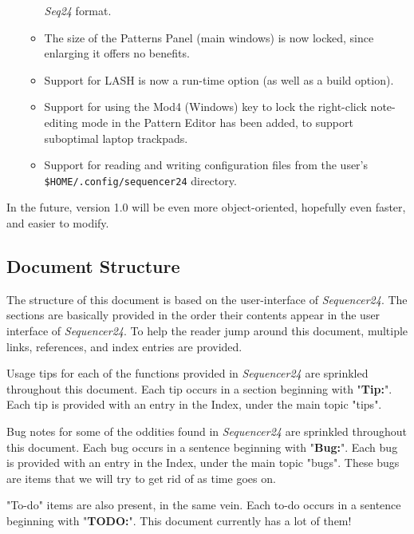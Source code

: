 \documentclass[
 11pt,
 twoside,
 a4paper,
 headinclude,
 footinclude,
 final                                 %
]{article}
\begin{document}
\begin{itemize}
\begin{itemize}
            \textsl{Seq24} format.
         \item The size of the Patterns Panel (main windows) is now locked,
            since enlarging it offers no benefits.
         \item Support for LASH is now a run-time option (as well as a build
            option).
         \item Support for using the Mod4 (Windows) key to lock the
            right-click note-editing mode in the Pattern Editor has been
            added, to support suboptimal laptop trackpads.
         \item Support for reading and writing configuration files from the
            user's \texttt{\$HOME/.config/sequencer24} directory.
      \end{itemize}
   \end{itemize}

   In the future, version 1.0 will be even more object-oriented, hopefully
   even faster, and easier to modify.

\subsection{Document Structure}
\label{subsec:introduction_document_structure}

   The structure of this document is based on the user-interface of
   \textsl{Sequencer24}.  The sections are basically provided in the order
   their contents appear in the user interface of \textsl{Sequencer24}.  To
   help the reader jump around this document, multiple links, references,
   and index entries are provided.

   Usage tips
   for each of the functions provided in
   \textsl{Sequencer24} are sprinkled throughout this document.
   Each tip occurs in a section beginning with "\textbf{Tip:}".
   Each tip is provided with an entry in the Index, under the
   main topic "tips".

   Bug notes
   for some of the oddities found in \textsl{Sequencer24} are
   sprinkled throughout this document.
   Each bug occurs in a sentence beginning with "\textbf{Bug:}".
   Each bug is provided with an entry in the Index, under the
   main topic "bugs".  These bugs are items that we will try to
   get rid of as time goes on.

   "To-do" items
   are also present, in the same vein.
   Each to-do occurs in a sentence beginning with "\textbf{TODO:}".
   This document currently has a lot of them!
\end{document}
